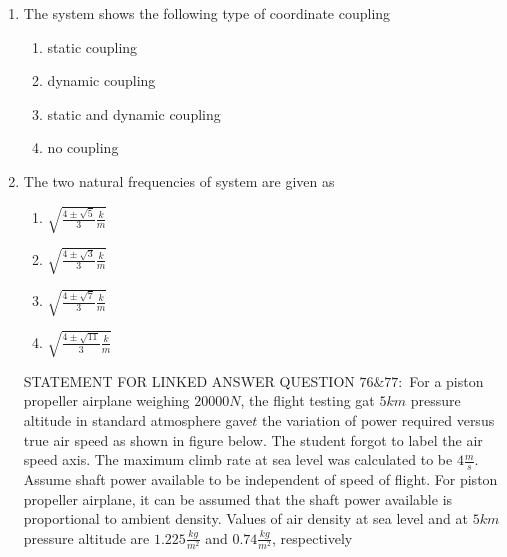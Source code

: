 \documentclass[journal]{IEEEtran}
\begin{document}
\begin{enumerate}


 \item The system shows the following type of coordinate coupling
     \begin{enumerate}
         \item static coupling
         \item dynamic coupling
         \item static and dynamic coupling
         \item no coupling
     \end{enumerate}
     \item The two natural frequencies of system are given as
     \begin{enumerate}
         \item $\sqrt{\frac{4\pm\sqrt{5}}{3}\frac{k}{m}}$
         \item $\sqrt{\frac{4\pm\sqrt{3}}{3}\frac{k}{m}}$
         \item $\sqrt{\frac{4\pm\sqrt{7}}{3}\frac{k}{m}}$
         \item $\sqrt{\frac{4\pm\sqrt{11}}{3}\frac{k}{m}}$
     \end{enumerate}
     STATEMENT FOR LINKED ANSWER QUESTION $76\&77:$ For a piston propeller airplane weighing $20000 N$, the flight testing gat $5 km$ pressure altitude in standard atmosphere gave$ t$ the variation of power required versus true air speed as shown in figure below. The student forgot to label the air speed axis. The maximum climb rate at sea level was calculated to be $4 \frac{m}{s}$. Assume shaft power available to be independent of speed of flight. For piston propeller airplane, it can be assumed that the shaft power available is proportional to ambient density. Values of air density at sea level and at $5 km$ pressure altitude are $1.225 \frac{kg}{m^2}$ and $0.74 \frac{kg}{m^2}$, respectively
\end{enumerate}
\end{document}
